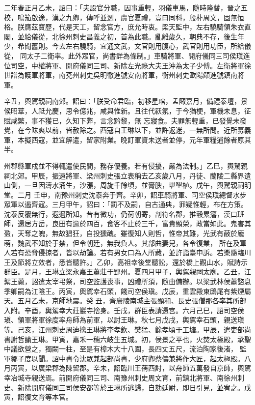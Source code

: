 \begin{pinyinscope}
 二年春正月乙未，詔曰：「夫設官分職，因事重輕，羽儀車馬，隨時隆替，晉之五校，鳴笳啟途，漢之九卿，傳呼並迾，虞官夏禮，豈曰同科，殷朴周文，固無恒格。朕膺茲寶歷，代是天工，留念官方，庶允時衷。梁天監中，左右驍騎領朱衣直閣，並給儀從，北徐州刺史昌義之初，首為此職。亂離歲久，朝典不存，後生年少，希聞舊則。今去左右驍騎，宜通文武，文官則用腹心，武官則用功臣，所給儀從，
 同太子二衛率。此外眾官，尚書詳為條制。」車騎將軍、開府儀同三司侯瑱進位司空，中權將軍、開府儀同三司、新除左光祿大夫王沖為太子少傅。左衛將軍徐世譜為護軍將軍，南兗州刺史吳明徹進號安南將軍，衡州刺史歐陽頠進號鎮南將軍。



 辛丑，輿駕親祠南郊。詔曰：「朕受命君臨，初移星琯，孟陬嘉月，備禮泰壇，景候昭華，人祗允慶，思令億兆，咸與惟新。且往代祅氛，于今猶梗，軍機未息，征賦咸繁，事不獲已，久知下弊，言念黔黎，無
 忘寢食。夫罪無輕重，已發覺未發覺，在今昧爽以前，皆赦除之。西寇自王琳以下，並許返迷，一無所問。近所募義軍，本擬西寇，並宜解遣，留家附業。晚訂軍資未送者並停，元年軍糧逋餘者原其半。



 州郡縣軍戍並不得輒遣使民間，務存優養。若有侵擾，嚴為法制。」乙巳，輿駕親祠北郊。甲辰，振遠將軍、梁州刺史張立表稱去乙亥歲八月，丹徒、蘭陵二縣界遺山側，一旦因濤水涌生，沙漲，周旋千餘頃，並膏腴，堪墾植。戊午，輿駕親祠明堂。二月
 壬申，南豫州刺史沈泰奔于齊。辛卯，詔車騎將軍、司空侯瑱總督水步眾軍以遏齊寇。三月甲午，詔曰：「罰不及嗣，自古通典，罪疑惟輕，布在方策。沈泰反覆無行，遐邇所知。昔有微功，仍荷朝寄，剖符名郡，推轂累籓，漢口班師，還居方岳，良田有逾於四百，食客不止於三千，富貴顯榮，政當如此。鬼害其盈，天奪之魄，無故猖狂，自投獯醜。雖復知人則哲，惟帝其難，光武有蔽於龐萌，魏武不知於于禁，但令朝廷，無我負人。其部曲妻兒，各令復業，
 所在及軍人若有恐脅侵掠者，皆以劫論。若有男女口為人所藏，並許詣臺申訴。若樂隨臨川王及節將立效者，悉皆聽許。」乙卯，高祖幸後堂聽訟，還於橋上觀山水，賦詩示群臣。是月，王琳立梁永嘉王蕭莊于郢州。夏四月甲子，輿駕親祠太廟。乙丑，江絮王薨，詔遣太宰弔祭，司空監護喪事，凶禮所須，隨由備辦。以梁武林侯蕭諮息季卿嗣為江陰王。丙寅，輿駕幸石頭，餞司空侯瑱。戊辰，重雲殿東鴟尾有紫煙屬天。五月乙未，京師地震。癸
 丑，齊廣陵南城主張顯和、長史張僧那各率其所部入附。辛酉，輿駕幸大莊巖寺捨身。壬戌，群臣表請還宮。六月己巳，詔司空侯瑱、領軍將軍徐度率舟師為前軍，以討王琳。秋七月戊戌，輿駕幸石頭，親送瑱等。己亥，江州刺史周迪擒王琳將李孝欽、樊猛、餘孝頃于工塘。甲辰，遣吏部尚書謝哲諭王琳。甲寅，嘉禾一穗六岐生五城。初，侯景之平也，火焚太極殿，承聖中議欲營之，獨闕一柱，至是有樟木大十八圍，長四丈五尺，流泊陶家後渚，
 監軍鄒子度以聞。詔中書令沈眾兼起部尚書，少府卿蔡儔兼將作大匠，起太極殿。八月丙寅，以廣梁郡為陳留郡。辛未，詔臨川王蒨西討，以舟師五萬發自京師，輿駕幸冶城寺親送焉。前開府儀同三司、南豫州刺史周文育，前鎮北將軍、南徐州刺史、新除開府儀同三司侯安都等於王琳所逃歸，自劾廷尉，即日引見，並宥之。戊寅，詔復文育等本官。




\end{pinyinscope}
